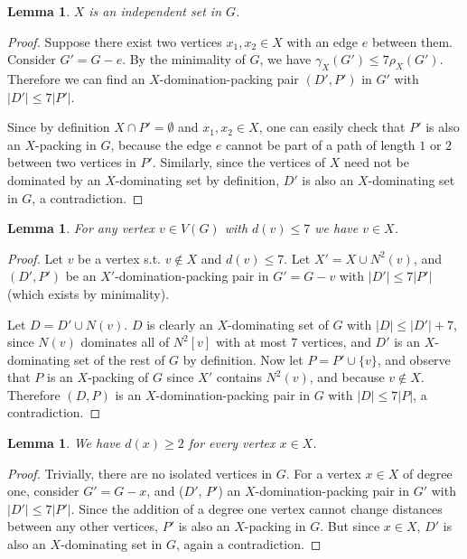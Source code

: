 \documentclass[a4paper, 12pt]{article}
\newtheorem{lemma}[theorem]{Lemma}
\begin{document}
\begin{lemma}\label{lem:x_independent}
    $X$ is an independent set in $G$.
\end{lemma}
\begin{proof}

Suppose there exist two vertices $x_1, x_2 \in X$ with an edge $e$ between them. Consider $G' = G - e$. By the minimality of $G$, we have $\gamma_{X}(G') \leq 7\rho_{X}(G')$. Therefore we can find an $X$-domination-packing pair $(D',P')$ in $G'$ with $\vert D'\vert \leq 7\vert P'\vert$. 

Since by definition $X \cap P' = \emptyset$ and $x_1, x_2 \in X$, one can easily check that $P'$ is also an $X$-packing in $G$, because the edge $e$ cannot be part of a path of length $1$ or $2$ between two vertices in $P'$. Similarly, since the vertices of $X$ need not be dominated by an $X$-dominating set by definition, $D'$ is also an $X$-dominating set in $G$, a contradiction.
\end{proof}

\begin{lemma}\label{lem:x_deg_7}
    For any vertex $v \in V(G)$ with $d(v) \leq 7$ we have $v \in X$.
\end{lemma}

\begin{proof}

Let $v$ be a vertex s.t. $v \not \in X$ and $d(v) \leq 7$. Let $X' = X \cup N^2(v)$, and $(D',P')$ be an $X'$-domination-packing pair in $G' = G-v$ with $\vert D'\vert \leq 7\vert P' \vert$ (which exists by minimality).

Let $D = D' \cup N(v)$. $D$ is clearly an $X$-dominating set of $G$ with $\vert D\vert \leq \vert D'\vert + 7$, since $N(v)$ dominates all of $N^2[v]$ with at most $7$ vertices, and $D'$ is an $X$-dominating set of the rest of $G$ by definition. Now let $P = P'\cup \{v\}$, and observe that $P$ is an $X$-packing of $G$ since $X'$ contains $N^2(v)$, and because $v\notin X$. Therefore $(D, P)$ is an $X$-domination-packing pair in $G$ with $\vert D\vert \leq 7\vert P \vert$, a contradiction.
\end{proof}

\newpage

\begin{lemma}\label{lem:x_deg_2}
    We have $d(x) \geq 2$ for every vertex $x \in X$.
\end{lemma}

\begin{proof}

Trivially, there are no isolated vertices in $G$. For a vertex $x \in X$ of degree one, consider $G' = G-x$, and ($D'$, $P'$) an $X$-domination-packing pair in $G'$ with $\vert D'\vert \leq 7\vert P' \vert$. Since the addition of a degree one vertex cannot change distances between any other vertices, $P'$ is also an $X$-packing in $G$. But since $x \in X$, $D'$ is also an $X$-dominating set in $G$, again a contradiction.
\end{proof}
\end{document}
